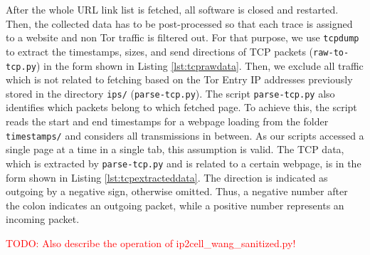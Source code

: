 
After the whole \ac{URL} link list is fetched, all software is closed and restarted. Then, the collected data has to be post-processed so that each trace is assigned to a website and non Tor traffic is filtered out. For that purpose, we use \texttt{tcpdump} to extract the timestamps, sizes, and send directions of \ac{TCP} packets (\texttt{raw-to-tcp.py}) in the form shown in Listing \ref{lst:tcprawdata}. Then, we exclude all traffic which is not related to fetching based on the Tor Entry \ac{IP} addresses previously stored in the directory \texttt{ips/} (\texttt{parse-tcp.py}). The script \texttt{parse-tcp.py} also identifies which packets belong to which fetched page. To achieve this, the script reads the start and end timestamps for a webpage loading from the folder \texttt{timestamps/} and considers all transmissions in between. As our scripts accessed a single page at a time in a single tab, this assumption is valid. The \ac{TCP} data, which is extracted by \texttt{parse-tcp.py} and is related to a certain webpage, is in the form shown in Listing \ref{lst:tcpextracteddata}. The direction is indicated as outgoing by a negative sign, otherwise omitted. Thus, a negative number after the colon indicates an outgoing packet, while a positive number represents an incoming packet. 


\textcolor{red}{TODO: Also describe the operation of ip2cell\_wang\_sanitized.py!}

